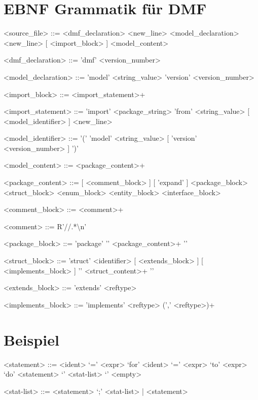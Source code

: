 \documentclass{article}
\begin{document}
\section{EBNF Grammatik für DMF}
\setlength{\grammarparsep}{20pt plus 1pt minus 1pt} %
\setlength{\grammarindent}{12em} %

\begin{grammar}
<source_file> ::= <dmf_declaration> <new_line> <model_declaration> <new_line> [ <import_block> ] <model_content>

<dmf_declaration> ::= 'dmf' <version_number>


<model_declaration> ::= 'model' <string_value> 'version' <version_number>

<import_block> ::= <import_statement>+

<import_statement> ::= 'import' <package_string> 'from' <string_value> [ <model_identifier> ] <new_line>

<model_identifier> ::= '(' 'model' <string_value> [ 'version' <version_number> ] ')'


<model_content> ::= <package_content>+

<package_content> ::= [ <comment_block> ] [ 'expand' ] <package_block>
 <struct_block>
 <enum_block>
 <entity_block>
 <interface_block>

<comment_block> ::= <comment>+

<comment> ::= R'//.*\textbackslash n'

<package_block> ::= 'package' '{' <package_content>+ '}'

<struct_block> ::= 'struct' <identifier> [ <extends_block> ] [ <implements_block> ] '{' <struct_content>+ '}'

<extends_block> ::= 'extends' <reftype>

<implements_block> ::= 'implements' <reftype> (',' <reftype>)+



\end{grammar}

\section{Beispiel}
\setlength{\grammarparsep}{20pt plus 1pt minus 1pt} %
\setlength{\grammarindent}{12em} %

\begin{grammar}
<statement> ::= <ident> `=' <expr> 
\alt `for' <ident> `=' <expr> `to' <expr> `do' <statement> 
\alt `{' <stat-list> `}' 
\alt <empty> 

<stat-list> ::= <statement> `;' <stat-list> | <statement> 

\end{grammar}
\end{document}
